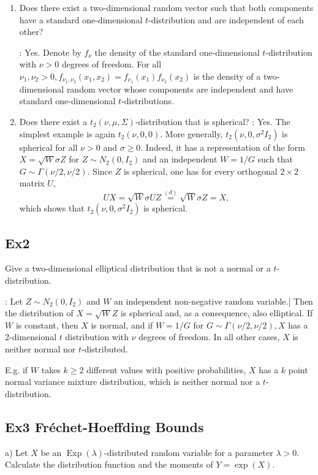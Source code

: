 \begin{enumerate}[label = (\arabic*), leftmargin=*]
    \item Does there exist a two-dimensional random vector such that both components have a standard one-dimensional $t$-distribution and are independent of each other?

: Yes. Denote by $f_{\nu}$ the density of the standard one-dimensional $t$-distribution with $\nu>0$ degrees of freedom. For all $\nu_{1}, \nu_{2}>0, f_{\nu_{1}, \nu_{2}}\left(x_{1}, x_{2}\right)=f_{\nu_{1}}\left(x_{1}\right) f_{\nu_{2}}\left(x_{2}\right)$ is the density of a two-dimensional random vector whose components are independent and have standard one-dimensional $t$-distributions.
    \item Does there exist a $t_{2}(\nu, \mu, \Sigma)$-distribution that is spherical?
: Yes. The simplest example is again $t_{2}(\nu, 0,0)$. More generally, $t_{2}\left(\nu, 0, \sigma^{2} I_{2}\right)$ is spherical for all $\nu>0$ and $\sigma \geq 0$. Indeed, it has a representation of the form $X=\sqrt{W} \sigma Z$ for $Z \sim N_{2}\left(0, I_{2}\right)$ and an independent $W=1 / G$ such that $G \sim \Gamma(\nu / 2, \nu / 2)$. Since $Z$ is spherical, one has for every orthogonal $2 \times 2$ matrix $U$,
$$
U X=\sqrt{W} \sigma U Z \stackrel{(d)}{=} \sqrt{W} \sigma Z=X,
$$
which shows that $t_{2}\left(\nu, 0, \sigma^{2} I_{2}\right)$ is spherical.
\end{enumerate}


\subsection*{Ex2}
Give a two-dimensional elliptical distribution that is not a normal or a $t$-distribution.

: Let $Z \sim N_{2}\left(0, I_{2}\right)$ and $W$ an independent non-negative random variable.| Then the distribution of $X=\sqrt{W} Z$ is spherical and, as a consequence, also elliptical. If $W$ is constant, then $X$ is normal, and if $W=1 / G$ for $G \sim \Gamma(\nu / 2, \nu / 2), X$ has a 2-dimensional $t$ distribution with $\nu$ degrees of freedom. In all other cases, $X$ is neither normal nor $t$-distributed.

E.g. if $W$ takes $k \geq 2$ different values with positive probabilities, $X$ has a $k$ point normal variance mixture distribution, which is neither normal nor a $t$-distribution.




\subsection*{Ex3 Fréchet-Hoeffding Bounds}
a) Let $X$ be an $\operatorname{Exp}(\lambda)$-distributed random variable for a parameter $\lambda>0$. Calculate the distribution function and the moments of $Y=\exp (X)$.

